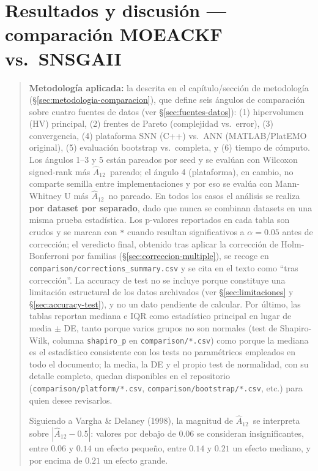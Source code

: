 \providecommand{\Atwelve}{\ensuremath{\hat{A}_{12}}}

\section{Resultados y discusión --- comparación MOEACKF vs.\ SNSGAII}
\label{sec:resultados-discusion}

\begin{quote}
\noindent\textbf{Metodología aplicada:} la descrita en el capítulo/sección de metodología
(\S\ref{sec:metodologia-comparacion}), que define seis ángulos de comparación sobre cuatro
fuentes de datos (ver \S\ref{sec:fuentes-datos}): (1) hipervolumen (HV) principal, (2) frentes de
Pareto (complejidad vs.\ error), (3) convergencia, (4) plataforma SNN (C++) vs.\ ANN
(MATLAB/PlatEMO original), (5) evaluación bootstrap vs.\ completa, y (6) tiempo de cómputo. Los
ángulos 1--3 y 5 están pareados por seed y se evalúan con Wilcoxon signed-rank más \Atwelve\
pareado; el ángulo 4 (plataforma), en cambio, no comparte semilla entre implementaciones y por
eso se evalúa con Mann-Whitney U más \Atwelve\ no pareado. En todos los casos el análisis se
realiza \textbf{por dataset por separado}, dado que nunca se combinan datasets en una misma
prueba estadística. Los p-valores reportados en cada tabla son crudos y se marcan con
\texttt{*} cuando resultan significativos a $\alpha=0.05$ antes de corrección; el veredicto
final, obtenido tras aplicar la corrección de Holm-Bonferroni por familias
(\S\ref{sec:correccion-multiple}), se recoge en \texttt{comparison/corrections\_summary.csv} y se
cita en el texto como ``tras corrección''. La accuracy de test no se incluye porque constituye
una limitación estructural de los datos archivados (ver \S\ref{sec:limitaciones} y
\S\ref{sec:accuracy-test}), y no un dato pendiente de calcular. Por último, las tablas reportan
mediana e IQR como estadístico principal en lugar de media $\pm$ DE, tanto porque varios grupos
no son normales (test de Shapiro-Wilk, columna \texttt{shapiro\_p} en \texttt{comparison/*.csv})
como porque la mediana es el estadístico consistente con los tests no paramétricos empleados en
todo el documento; la media, la DE y el propio test de normalidad, con su detalle completo,
quedan disponibles en el repositorio (\texttt{comparison/platform/*.csv},
\texttt{comparison/bootstrap/*.csv}, etc.) para quien desee revisarlos.

\smallskip
\noindent Siguiendo a Vargha \& Delaney (1998), la magnitud de \Atwelve\ se interpreta sobre
$|\Atwelve-0.5|$: valores por debajo de $0.06$ se consideran insignificantes, entre $0.06$ y
$0.14$ un efecto pequeño, entre $0.14$ y $0.21$ un efecto mediano, y por encima de $0.21$ un
efecto grande.
\end{quote}

